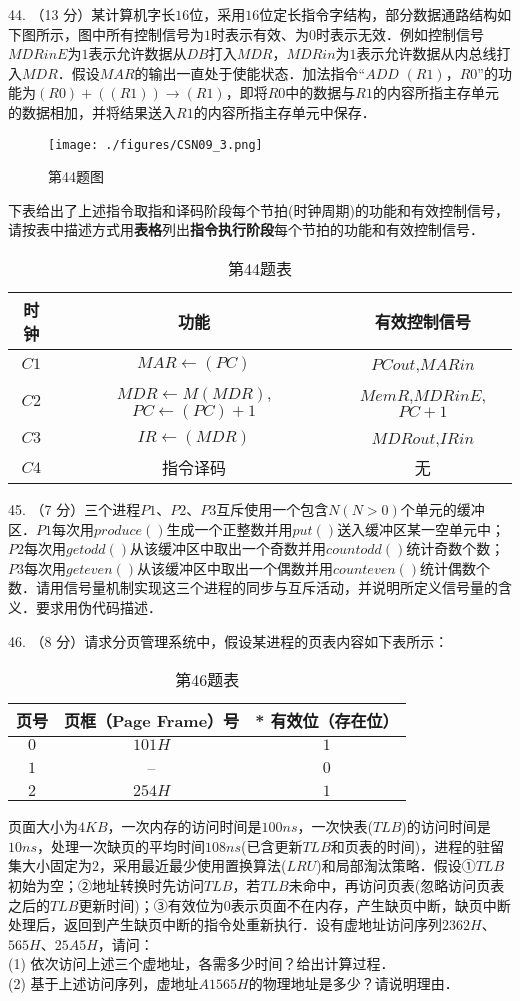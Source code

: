44. （13 分）某计算机字长$16$位，采用$16$位定长指令字结构，部分数据通路结构如下图所示，图中所有控制信号为$1$时表示有效、为$0$时表示无效．例如控制信号$MDRinE$为$1$表示允许数据从$DB$打入$MDR$，$MDRin$为$1$表示允许数据从内总线打入$MDR$．假设$MAR$的输出一直处于使能状态．加法指令“$ADD$ $(R1)$，$R0$”的功能为$(R0)+((R1)) \rightarrow (R1)$，即将$R0$中的数据与$R1$的内容所指主存单元的数据相加，并将结果送入$R1$的内容所指主存单元中保存．
\begin{figure}[ht]
\centering
\texttt{[image: ./figures/CSN09\_3.png]}
\caption{第44题图} \label{CSN09_fig3}
\end{figure}
下表给出了上述指令取指和译码阶段每个节拍(时钟周期)的功能和有效控制信号，请按表中描述方式用\textbf{表格}列出\textbf{指令执行阶段}每个节拍的功能和有效控制信号．
\begin{table}[ht]
\centering
\caption{第44题表}\label{CSN09_tab2}
\begin{tabular}{|c|c|c|}
\hline
时钟 & 功能 & 有效控制信号 \\
\hline
$C1$ & $MAR\leftarrow(PC)$ & $PCout$,$MARin$ \\
\hline
$C2$ & $MDR\leftarrow M(MDR)$,$PC\leftarrow(PC)+1$ & $MemR$,$MDRinE$,$PC+1$ \\
\hline
$C3$ & $IR\leftarrow(MDR)$ & $MDRout$,$IRin$ \\
\hline
$C4$ & 指令译码 & 无 \\
\hline
\end{tabular}
\end{table}

45. （7 分）三个进程$P1$、$P2$、$P3$互斥使用一个包含$N(N>0)$个单元的缓冲区．$P1$每次用$produce()$生成一个正整数并用$put()$送入缓冲区某一空单元中；$P2$每次用$getodd()$从该缓冲区中取出一个奇数并用$countodd()$统计奇数个数；$P3$每次用$geteven()$从该缓冲区中取出一个偶数并用$counteven()$统计偶数个数．请用信号量机制实现这三个进程的同步与互斥活动，并说明所定义信号量的含义．要求用伪代码描述．

46. （8 分）请求分页管理系统中，假设某进程的页表内容如下表所示：
\begin{table}[ht]
\centering
\caption{第46题表}\label{CSN09_tab3}
\begin{tabular}{|c|c|c|}
\hline
页号 & 页框（Page Frame）号 & * 有效位（存在位） \\
\hline
$0$ & $101H$ & $1$ \\
\hline
$1$ & -- & $0$ \\
\hline
$2$ & $254H$ & $1$ \\
\hline
\end{tabular}
\end{table}
页面大小为$4KB$，一次内存的访问时间是$100ns$，一次快表($TLB$)的访问时间是$10ns$，处理一次缺页的平均时间$108ns$(已含更新$TLB$和页表的时间)，进程的驻留集大小固定为$2$，采用最近最少使用置换算法($LRU$)和局部淘汰策略．假设①$TLB$初始为空；②地址转换时先访问$TLB$，若$TLB$未命中，再访问页表(忽略访问页表之后的$TLB$更新时间)；③有效位为$0$表示页面不在内存，产生缺页中断，缺页中断处理后，返回到产生缺页中断的指令处重新执行．设有虚地址访问序列$2362H$、$565H$、$25A5H$，请问： \\
(1) 依次访问上述三个虚地址，各需多少时间？给出计算过程． \\
(2) 基于上述访问序列，虚地址$A1565H$的物理地址是多少？请说明理由．

